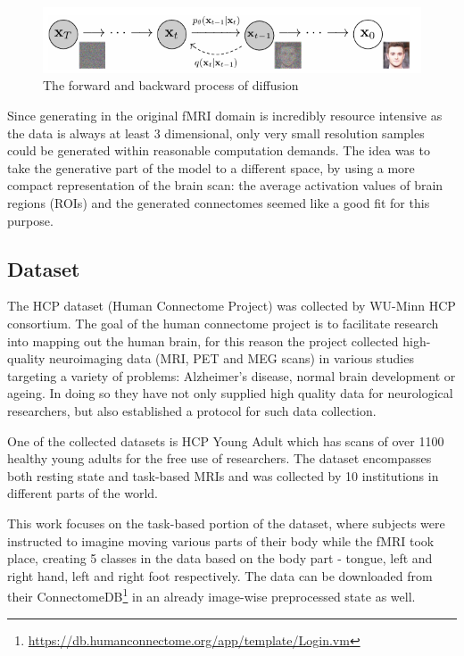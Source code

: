 	\begin{figure}[!h]
		\centering
		\includegraphics[width=\textwidth]{figures/diffusion.png}
		\caption{The forward and backward process of diffusion\cite{ho2020denoising}}
	\end{figure}
	
	
	Since generating in the original fMRI domain is incredibly resource intensive as the data is always at least 3 dimensional, only very small resolution samples could be generated within reasonable computation demands. The idea was to take the generative part of the model to a different space, by using a more compact representation of the brain scan: the average activation values of brain regions (ROIs) and the generated connectomes seemed like a good fit for this purpose.

	\subsection{Dataset}
	\label{sec:HCP}
	
	The HCP dataset (Human Connectome Project) was collected by WU-Minn HCP consortium. The goal of the human connectome project is to facilitate research into mapping	out the human brain, for this reason the project collected high-quality neuroimaging data (MRI, PET and MEG scans) in various studies targeting a variety of problems: Alzheimer's disease, normal brain development or ageing. In doing so they have not only supplied high quality data for neurological researchers, but also established a protocol for such data collection\cite{van2012human}.
	
	One of the collected datasets is HCP Young Adult which has scans of over 1100 healthy young adults for the free use of researchers. The dataset encompasses both resting state and task-based MRIs and was collected by 10 institutions in different parts of the world. 
	
	This work focuses on the task-based portion of the dataset, where subjects were instructed to imagine moving various parts of their body while the fMRI took place, creating 5 classes in the data based on the body part - tongue, left and right hand, left and right foot respectively. The data can be downloaded from their ConnectomeDB\footnote{\url{https://db.humanconnectome.org/app/template/Login.vm}} in an already image-wise preprocessed state as well. 
	
